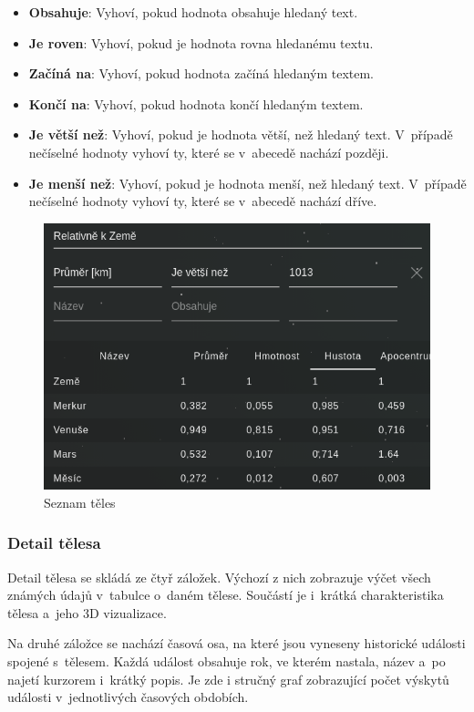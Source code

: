 \documentclass[a4paper,12pt]{article}
\begin{document}
\begin{itemize}
\item \textbf{Obsahuje}: Vyhoví, pokud hodnota obsahuje hledaný text.
\item \textbf{Je roven}: Vyhoví, pokud je hodnota rovna hledanému textu.
\item \textbf{Začíná na}: Vyhoví, pokud hodnota začíná hledaným textem.
\item \textbf{Končí na}: Vyhoví, pokud hodnota končí hledaným textem.
\item \textbf{Je větší než}: Vyhoví, pokud je hodnota větší, než hledaný text. V~případě nečíselné hodnoty vyhoví ty, které se v~abecedě nachází později.
\item \textbf{Je menší než}: Vyhoví, pokud je hodnota menší, než hledaný text. V~případě nečíselné hodnoty vyhoví ty, které se v~abecedě nachází dříve.
\end{itemize} 

\begin{figure}[H]
\begin{center}
\includegraphics[width=350pt]{Images/Bodies.png}
\caption{Seznam těles}
\label{BodiesList}
\end{center}
\end{figure}

\subsubsection{Detail tělesa}

Detail tělesa se skládá ze čtyř záložek. Výchozí z nich zobrazuje výčet všech známých údajů v~tabulce o~daném tělese. Součástí je i~krátká charakteristika tělesa a~jeho 3D vizualizace.

Na druhé záložce se nachází časová osa, na které jsou vyneseny historické události spojené s~tělesem. Každá událost obsahuje rok, ve kterém nastala, název a~po najetí kurzorem  i~krátký popis. Je zde i stručný graf zobrazující počet výskytů události v~jednotlivých časových obdobích.
\end{document}
